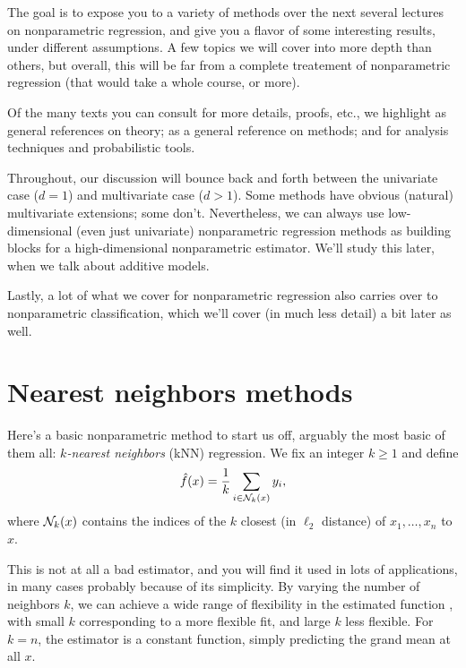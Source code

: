 \documentclass{article}
\begin{document}
The goal is to expose you to a variety of methods over the next several lectures
on nonparametric regression, and give you a flavor of some interesting results,
under different assumptions.  A few topics we will cover into more depth than
others, but overall, this will be far from a complete treatement of
nonparametric regression (that would take a whole course, or more).  

Of the many texts you can consult for more details, proofs, etc., we highlight
\citet{gyorfi2002distribution, wasserman2006all, tsybakov2009introduction} as
general references on theory; \citet{hastie2009elements} as a general reference
on methods; and \citet{vandegeer2000empirical, wainwright2019high} for analysis
techniques and probabilistic tools.

Throughout, our discussion will bounce back and forth between the univariate
case ($d=1$) and multivariate case ($d>1$). Some methods have obvious (natural) 
multivariate extensions; some don't. Nevertheless, we can always use
low-dimensional (even just univariate) nonparametric regression methods as
building blocks for a high-dimensional nonparametric estimator.  We'll study
this later, when we talk about additive models.

Lastly, a lot of what we cover for nonparametric regression also carries over to
nonparametric classification, which we'll cover (in much less detail) a bit
later as well.

\section{Nearest neighbors methods}

Here's a basic nonparametric method to start us off, arguably the most basic of
them all: \emph{$k$-nearest neighbors} (kNN) regression. We fix an integer $k
\geq 1$ and define 
\begin{equation}
\label{eq:knn}
\hat{f}(x) = \frac{1}{k} \sum_{i \in \mathcal{N}_k(x)} y_i,
\end{equation}
where $\mathcal{N}_k(x)$ contains the indices of the $k$ closest (in $\ell_2$ distance)
of $x_1,\dots,x_n$ to $x$. 

This is not at all a bad estimator, and you will find it used in lots of
applications, in many cases probably because of its simplicity. By varying the 
number of neighbors $k$, we can achieve a wide range of flexibility in the
estimated function \smash{$\hf$}, with small $k$ corresponding to a more
flexible fit, and large $k$ less flexible. For $k=n$, the estimator
\smash{$\hf$} is a constant function, simply predicting the grand mean
 at all $x$.
\end{document}
